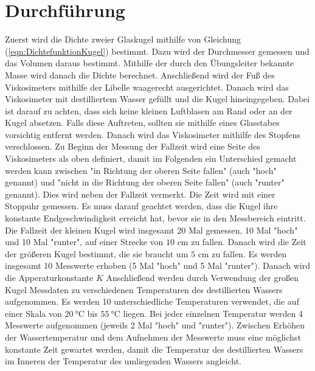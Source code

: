 \section{Durchführung}
\label{sec:Durchführung}
Zuerst wird die Dichte zweier Glaskugel mithilfe von Gleichung (\ref{eqn:DichtefunktionKugel}) bestimmt. 
Dazu wird der Durchmesser gemessen und das Volumen daraus bestimmt. Mithilfe der durch den Übungsleiter 
bekannte Masse wird danach die Dichte berechnet. 
Anschließend wird der Fuß des Viskosimeters mithilfe der Libelle waagerecht ausgerichtet. 
Danach wird das Viskosimeter mit destilliertem Wasser gefüllt und die Kugel hineingegeben. 
Dabei ist darauf zu achten, dass sich keine kleinen Luftblasen am Rand oder an der Kugel absetzen. 
Falls diese Auftreten, sollten sie mithilfe eines Glasstabes vorsichtig entfernt werden. Danach wird 
das Viskosimeter mithilfe des Stopfens verschlossen. Zu Beginn der Messung der Fallzeit wird eine Seite 
des Viskosimeters als oben definiert, damit im Folgenden ein Unterschied gemacht werden kann zwischen 
"in Richtung der oberen Seite fallen" (auch "hoch" genannt) und "nicht in die Richtung der oberen Seite fallen"
(auch "runter" genannt). Dies wird neben der Fallzeit vermerkt. Die Zeit wird mit einer Stoppuhr gemessen. 
Es muss darauf geachtet werden, dass
die Kugel ihre konstante Endgeschwindigkeit erreicht hat, bevor sie in den Messbereich eintritt. 
Die Fallzeit der kleinen Kugel wird insgesamt 20 Mal gemessen, 10 Mal "hoch" und 10 Mal "runter", auf einer Strecke von 
$10$ \unit{\centi\meter} zu fallen. Danach wird die Zeit der größeren Kugel bestimmt, 
die sie braucht um $5$ \unit{\centi\meter} zu fallen.
Es werden insgesamt 10 Messwerte erhoben (5 Mal "hoch" und 5 Mal "runter").
Danach wird die Apperaturkonstante $K$ 
Anschließend werden durch Verwendung der großen Kugel 
Messdaten zu verschiedenen Temperaturen des destillierten Wassers aufgenommen. 
Es werden 10 unterschiedliche Temperaturen verwendet, die auf einer Skala von $\SI{20}{\celsius}$ bis 
$\SI{55}{\celsius}$ liegen. Bei jeder einzelnen Temperatur werden 4 Messwerte aufgenommen (jeweils 2 Mal "hoch" und "runter").
Zwischen Erhöhen der Wassertemperatur und dem Aufnehmen der Messwerte muss eine möglichst konstante Zeit gewartet werden, damit
die Temperatur des destillierten Wassers im Inneren der Temperatur des umliegenden Wassers angleicht. 

